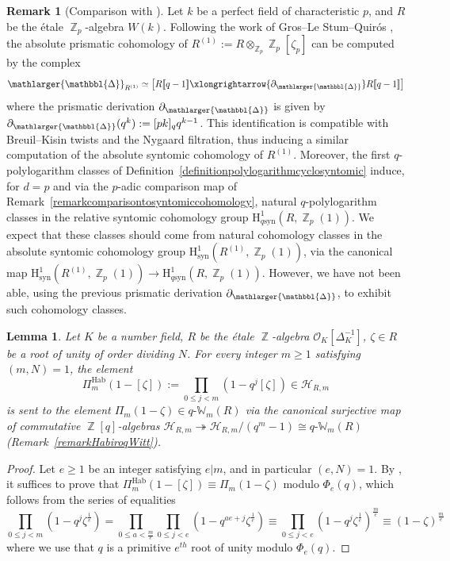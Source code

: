 \documentclass[10pt,twoside]{scrarticle}
\newlength{\mar} \setlength{\mar}{1cm}%
\newlength{\len}
\newtheorem{lemma}[theorem]{Lemma}
\theoremstyle{definition}
\newtheorem{remark}[theorem]{Remark}
\DeclareMathOperator{\Z}{\mathbb{Z}}
\newcommand{\Hab}{\mathrm{Hab}}
\newcommand{\qWm}{q\text{-}\mathbb{W}_m}
\renewcommand{\ge}{\geqslant}
\renewcommand{\le}{\leqslant}
\newcommand{\Prism}{{\mathlarger{\mathbbl{\Delta}}}}
\numberwithin{equation}{theorem}
\begin{document}
\begin{remark}[Comparison with \cite{gros_absolute_2023}]
    Let $k$ be a perfect field of characteristic $p$, and $R$ be the étale $\Z_p$-algebra $W(k)$. Following the work of Gros--Le Stum--Quirós \cite{gros_absolute_2023}, the absolute prismatic cohomology of $R^{(1)}:=R \otimes_{\Z_p} \Z_p[\zeta_p]$ can be computed by the complex
    $$\Prism_{R^{(1)}} \simeq \left[ R[\![q-1]\!]  \xlongrightarrow{\partial_{\Prism}} R[\![q-1]\!] \right]$$
    where the prismatic derivation $\partial_{\Prism}$ is given by $\partial_{\Prism}(q^k):=[pk]_q q^{k-1}$. This identification is compatible with Breuil--Kisin twists and the Nygaard filtration, thus inducing a similar computation of the absolute syntomic cohomology of $R^{(1)}$. Moreover, the first $q$-polylogarithm classes of Definition~\ref{definitionpolylogarithmcyclosyntomic} induce, for $d=p$ and via the $p$-adic comparison map of Remark~\ref{remarkcomparisontosyntomiccohomology}, natural $q$\nobreakdash-polylogarithm classes in the relative syntomic cohomology group $\text{H}^1_{q\text{syn}}(R,\Z_p(1))$. We expect that these classes should come from natural cohomology classes in the absolute syntomic cohomology group $\text{H}^1_{\text{syn}}(R^{(1)},\Z_p(1))$, via the canonical map $\text{H}^1_{\text{syn}}(R^{(1)},\Z_p(1)) \rightarrow \text{H}^1_{q\text{syn}}(R,\Z_p(1))$. However, we have not been able, using the previous prismatic derivation $\partial_{\Prism}$, to exhibit such cohomology classes. 
\end{remark}

\begin{lemma}\label{lemmaliftof1-zeta}
    Let $K$ be a number field, $R$ be the étale $\Z$-algebra $\mathcal{O}_K[\Delta_K^{-1}]$, $\zeta \in R$ be a root of unity of order dividing $N$. For every integer $m \ge 1$ satisfying $(m,N)=1$, the element
    $$\Pi_m^{\Hab}(1-[\zeta]) := \prod_{0 \le j < m}(1-q^j[\zeta]) \in \mathcal{H}_{R,m}$$
    is sent to the element $\Pi_m(1-\zeta) \in \qWm(R)$ via the canonical surjective map of commutative $\Z[q]$-algebras $\mathcal{H}_{R,m} \twoheadrightarrow \mathcal{H}_{R,m}/(q^m-1) \cong \qWm(R)$ (Remark~\ref{remarkHabiroqWitt}).
\end{lemma}

\begin{proof}
    Let $e \ge 1$ be an integer satisfying $e|m$, and in particular $(e ,N) = 1$. By \cite[Lemma~2.23]{wagner_q-witt_2024}, it suffices to prove that $\Pi_m^{\Hab}(1-[\zeta]) \equiv \Pi_m(1-\zeta)$ modulo $\Phi_e(q)$, which follows from the series of equalities
    $$\prod_{0 \le j < m}(1-q^j\zeta^{\frac{1}{e}}) = \prod_{0 \le a < \frac{m}{e}} \prod_{0 \le j < e}(1-q^{ae+j}\zeta^{\frac{1}{e}}) \equiv \prod_{0 \le j < e} (1-q^j \zeta^{\frac{1}{e}})^{\frac{m}{e}} \equiv (1-\zeta)^{\frac{m}{e}}$$
    where we use that $q$ is a primitive $e^{th}$ root of unity modulo $\Phi_e(q)$.
\end{proof}
\end{document}
